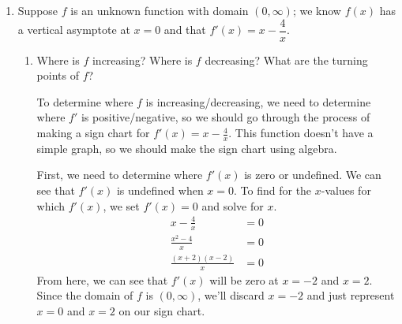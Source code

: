 \documentclass{article}
\begin{document}
\begin{enumerate}
\begin{enumerate}
\begin{solution}
\begin{itemize}
      \end{itemize}
      Therefore $f$ could have 1, 2, or 3 $x$-intercepts.
    \end{solution}
  \end{enumerate}

\item  

  Suppose $f$ is an unknown function with domain $(0, \infty)$; we know $f(x)$ has a vertical asymptote at $x = 0$ and that $f'(x) = x - \dfrac{4}{x}$.
  \begin{enumerate}
  \item
    \begin{problem}[\vfill\newpage]
      Where is $f$ increasing? Where is $f$ decreasing? What are the turning points of $f$?
    \end{problem}

    \begin{solution}
      To determine where $f$ is increasing/decreasing, we need to determine where $f'$ is positive/negative, so
      we should go through the process of making a sign chart for $f'(x)=x-\frac{4}{x}$. This function
      doesn't have a simple graph, so we should make the sign chart using algebra.

      First, we need to determine where $f'(x)$ is zero or undefined. We can see that $f'(x)$ is undefined
      when $x=0$. To find for the $x$-values for which $f'(x)$, we set $f'(x)=0$ and solve for $x$. 
      \begin{align*}
        x - \frac{4}{x} &= 0 \\
        \frac{x^2-4}{x} &= 0 \\
        \frac{(x+2)(x-2)}{x} &= 0 
      \end{align*}
      From here, we can see that $f'(x)$ will be zero at $x=-2$ and $x=2$. Since the domain of $f$ is
      $(0, \infty)$, we'll discard $x=-2$ and just represent $x=0$ and $x=2$ on our sign chart.

      \begin{center}
      \end{center}


\end{solution}
\end{enumerate}
\end{enumerate}
\end{document}
